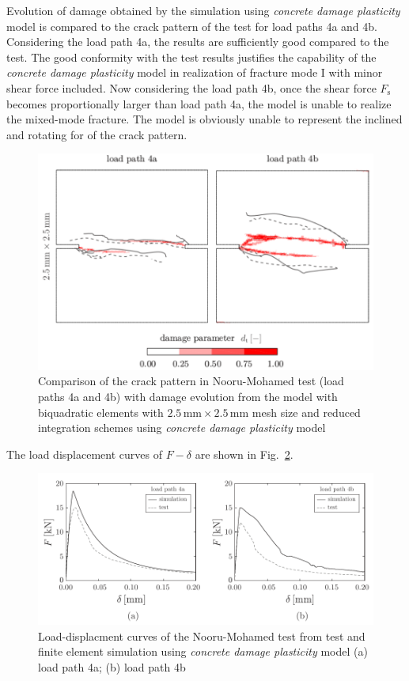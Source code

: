 \documentclass[main.tex]{subfiles}
\begin{document}
Evolution of damage obtained by the simulation using \textit{concrete damage plasticity} model is compared to the crack pattern of the test for load paths 4a and 4b. Considering the load path 4a, the results are sufficiently good compared to the test. The good conformity with the test results justifies the capability of the \textit{concrete damage plasticity} model in realization of fracture mode I with minor shear force included. Now considering the load path 4b, once the shear force $F_\mathrm{s}$ becomes proportionally larger than load path 4a, the model is unable to realize the mixed-mode fracture. The model is obviously unable to represent the inclined and rotating for of the crack pattern.
%
\begin{figure}
\centering
\includegraphics[width=12cm]{fig/nooru-mohamed-cracks-cdp.pdf}
\caption{Comparison of the crack pattern in Nooru-Mohamed test (load paths 4a and 4b) with damage evolution from the model with biquadratic elements with $2.5\,\mathrm{mm} \times 2.5\,\mathrm{mm}$ mesh size and reduced integration schemes using \textit{concrete damage plasticity} model}
\label{FIGnoorumodamedcrackcdp}
\end{figure}

The load displacement curves of $F-\delta$ are shown in Fig.~\ref{FIGnoorumodamedfdeltacdp}.
\begin{figure}
\centering
\includegraphics[scale=1]{fig/nooru-mohamed-f-delta-cdp.pdf}
\caption{Load-displacment curves of the Nooru-Mohamed test from test and finite element simulation using \textit{concrete damage plasticity} model (a) load path 4a; (b) load path 4b}
\label{FIGnoorumodamedfdeltacdp}
\end{figure}
\end{document}
